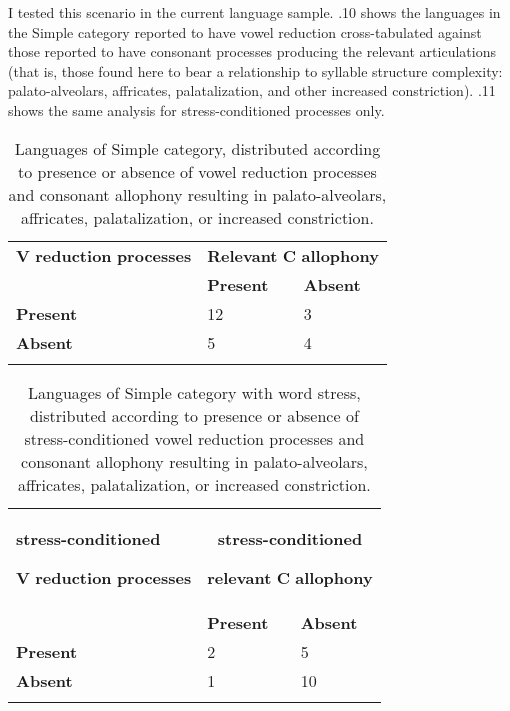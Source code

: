   I tested this scenario in the current language sample. .10 shows the languages in the Simple category reported to have vowel reduction cross-tabulated against those reported to have consonant processes producing the relevant articulations (that is, those found here to bear a relationship to syllable structure complexity: palato-alveolars, affricates, palatalization, and other increased constriction). .11 shows the same analysis for stress-conditioned processes only.






\begin{table}
\begin{tabularx}{\textwidth}{XXX}
\lsptoprule
 \textbf{V} \textbf{reduction} \textbf{processes} & \multicolumn{2}{c}{ \textbf{Relevant} \textbf{C} \textbf{allophony}}\\
\hhline{-~~} & \textbf{Present} & \textbf{Absent}\\
 \textbf{Present} & 12 & 3\\
 \textbf{Absent} & 5 & 4\\
\lspbottomrule
\end{tabularx}
\caption{\label{7.10}Languages of Simple category, distributed according to presence or absence of vowel reduction processes and consonant allophony resulting in palato-alveolars, affricates, palatalization, or increased constriction.}
\end{table}







\begin{table}
\begin{tabularx}{\textwidth}{XXX}
\lsptoprule
{ \textbf{stress-conditioned}}

 \textbf{V} \textbf{reduction} \textbf{processes} & \multicolumn{2}{c}{{ \textbf{stress-conditioned} }

 \textbf{relevant} \textbf{C} \textbf{allophony}}\\
\hhline{-~~} & \textbf{Present} & \textbf{Absent}\\
 \textbf{Present} & 2 & 5\\
 \textbf{Absent} & 1 & 10\\
\lspbottomrule
\end{tabularx}
\caption{\label{7.11}Languages of Simple category with word stress, distributed according to presence or absence of stress-conditioned vowel reduction processes and consonant allophony resulting in palato-alveolars, affricates, palatalization, or increased constriction.}
\end{table}




